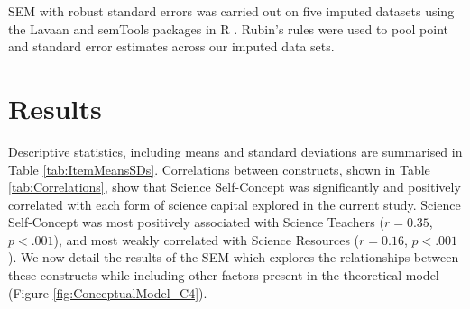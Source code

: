 SEM with robust standard errors \citep{huber1967behavior,white1982maximum} was carried out on five imputed datasets using the Lavaan \citep{rosseel2012lavaan} and semTools \citep{jorgensen2018package} packages in R \citep{team2013r}. Rubin's rules \citep{rubin2004multiple} were used to pool point and standard error estimates across our imputed data sets. 

\section{Results}
\label{results}
Descriptive statistics, including means and standard deviations are summarised in Table \ref{tab:ItemMeansSDs}. Correlations between constructs, shown in Table \ref{tab:Correlations}, show that Science Self-Concept was significantly and positively correlated with each form of science capital explored in the current study. Science Self-Concept was most positively associated with Science Teachers ($r = 0.35$, $p<.001$), and most weakly correlated with Science Resources ($r = 0.16$, $p<.001$). We now detail the results of the SEM which explores the relationships between these constructs while including other factors present in the theoretical model (Figure \ref{fig:ConceptualModel_C4}).


